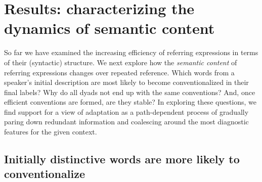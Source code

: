 \documentclass[alpha-refs]{wiley-article}
\begin{document}
\section{Results: characterizing the dynamics of semantic content}
\label{sec:content}

So far we have examined the increasing efficiency of referring expressions in terms of their (syntactic) structure.
We next explore how the \emph{semantic content} of referring expressions changes over repeated reference.
Which words from a speaker's initial description are most likely to become conventionalized in their final labels?
Why do all dyads not end up with the same conventions? And,
once efficient conventions are formed, are they stable?
In exploring these questions, we find support for a view of adaptation as a path-dependent process of gradually paring down redundant information and coalescing around the most diagnostic features for the given context.

\subsection{Initially distinctive words are more likely to conventionalize}
\label{sec:distinctive}
\end{document}
